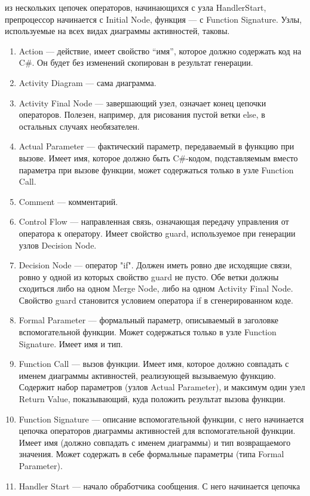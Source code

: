\begin{enumerate}
		из нескольких цепочек операторов, начинающихся с узла HandlerStart, препроцессор 
		начинается с Initial Node, функция --- с Function Signature. Узлы, используемые 
		на всех видах диаграммы активностей, таковы.
		\begin{enumerate}
			\item Action --- действие, имеет свойство "`имя"', которое должно содержать код 
				на C\#. Он будет без изменений скопирован в результат генерации.
			\item Activity Diagram --- сама диаграмма.
			\item Activity Final Node --- завершающий узел, означает конец цепочки операторов. 
				Полезен, например, для рисования пустой ветки else, в остальных случаях необязателен.
			\item Actual Parameter --- фактический параметр, передаваемый в функцию при вызове. 
				Имеет имя, которое должно быть C\#-кодом, подставляемым вместо параметра при 
				вызове функции, может содержаться только в узле Function Call.
			\item Comment --- комментарий.
			\item Control Flow --- направленная связь, означающая передачу управления от 
				оператора к оператору. Имеет свойство guard, используемое при генерации узлов 
				Decision Node.
			\item Decision Node --- оператор "if". Должен иметь ровно две исходящие связи, 
				ровно у одной из которых свойство guard не пусто. Обе ветки должны сходиться 
				либо на одном Merge Node, либо на одном Activity Final Node. Свойство guard 
				становится условием оператора if в сгенерированном коде.
			\item Formal Parameter --- формальный параметр, описываемый в заголовке вспомогательной 
				функции. Может содержаться только в узле Function Signature. Имеет имя и тип.
			\item Function Call --- вызов функции. Имеет имя, которое должно совпадать с 
				именем диаграммы активностей, реализующей вызываемую функцию. Содержит набор 
				параметров (узлов Actual Parameter), и максимум один узел Return Value, показывающий, 
				куда положить результат вызова функции.
			\item Function Signature --- описание вспомогательной функции, с него начинается 
				цепочка операторов диаграммы активностей для вспомогательной функции. Имеет имя 
				(должно совпадать с именем диаграммы) и тип возвращаемого значения. Может 
				содержать в себе формальные параметры (типа Formal Parameter).
			\item Handler Start --- начало обработчика сообщения. С него начинается цепочка 

\end{enumerate}
\end{enumerate}
